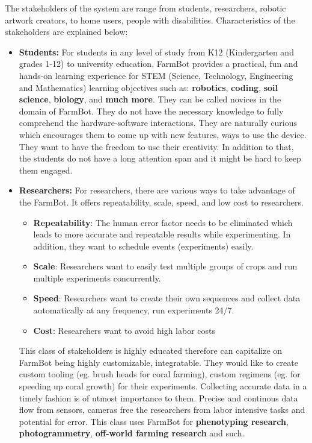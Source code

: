 The stakeholders of the system are range from students, researchers, robotic artwork creators, to home users, people with disabilities. Characteristics of the stakeholders are explained below:
\begin{itemize}
    \item \textbf{Students:} For students in any level of study from K12 (Kindergarten and grades 1-12) to university education, FarmBot provides a practical, fun and hands-on learning experience for STEM (Science, Technology, Engineering and Mathematics) learning objectives such as: \textbf{robotics}, \textbf{coding}, \textbf{soil science}, \textbf{biology}, and \textbf{much more}. They can be called novices in the domain of FarmBot. They do not have the necessary knowledge to fully comprehend the hardware-software interactions. They are naturally curious which encourages them to come up with new features, ways to use the device. They want to have the freedom to use their creativity. In addition to that, the students do not have a long attention span and it might be hard to keep them engaged.

    \item \textbf{Researchers:} For researchers, there are various ways to take advantage of the FarmBot. It offers repeatability, scale, speed, and low cost to researchers.
    \begin{itemize}
        \item \textbf{Repeatability}: The human error factor needs to be eliminated which leads to more accurate and repeatable results while experimenting. In addition, they want to schedule events (experiments) easily.
        \item \textbf{Scale}: Researchers want to easily test multiple groups of crops and run multiple experiments concurrently.
        \item \textbf{Speed}: Researchers want to create their own sequences and collect data automatically at any frequency, run experiments 24/7.
        \item \textbf{Cost}: Researchers want to avoid high labor costs
    \end{itemize}
    This class of stakeholders is highly educated therefore can capitalize on FarmBot being highly customizable, integratable. They would like to create custom tooling (eg. brush heads for coral farming), custom regimens (eg. for speeding up coral growth) for their experiments. Collecting accurate data in a timely fashion is of utmost importance to them. Precise and continous data flow from sensors, cameras free the researchers from labor intensive tasks and potential for error. This class uses FarmBot for \textbf{phenotyping research}, \textbf{photogrammetry}, \textbf{off-world farming research} and such.


\end{itemize}
